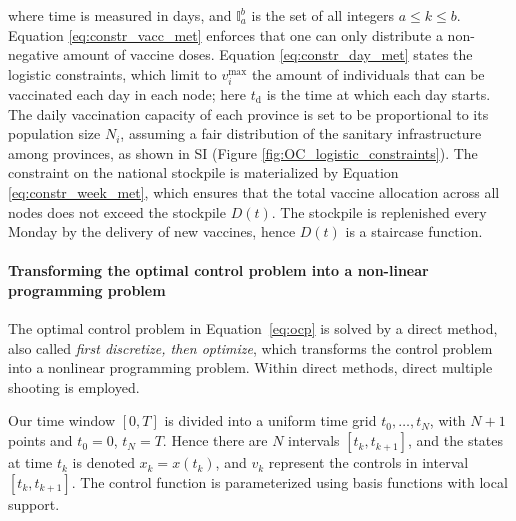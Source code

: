 where time is measured in days, and $\mathbb{I}_a^b$ is the set of all integers $a\leq k\leq b$. Equation \eqref{eq:constr_vacc_met} enforces that one can only distribute a non-negative amount of vaccine doses. Equation \eqref{eq:constr_day_met} states the logistic constraints, which limit to $v_i^\mathrm{max}$ the amount of individuals that can be vaccinated each day in each node; here $t_\mathrm{d}$ is the time at which each day starts. The daily vaccination capacity of each province is set to be proportional to its population size $N_i$, assuming a fair distribution of the sanitary infrastructure among provinces, as shown in SI (Figure \ref{fig:OC_logistic_constraints}). The constraint on the national stockpile is materialized by Equation
\eqref{eq:constr_week_met}, which ensures that the total vaccine allocation across all nodes does not exceed the stockpile $D(t)$. The stockpile is replenished every Monday by the delivery of new vaccines, hence $D(t)$ is a staircase function.



\paragraph{Transforming the optimal control problem into a non-linear programming problem}


The optimal control problem in Equation~\eqref{eq:ocp} is solved by a direct method, also called \emph{first discretize, then optimize}, which transforms the control problem into a nonlinear programming problem. Within direct methods, direct multiple shooting is employed. 


Our time window $[0,T]$ is divided into a uniform time grid $t_0,\ldots,t_N$, with $N+1$ points and $t_0=0$, $t_N=T$. Hence there are $N$ intervals $[t_k,t_{k+1}]$, and the states at time $t_k$ is denoted $x_k=x(t_k)$, and $v_k$  represent the controls in interval $[t_k,t_{k+1}]$. The control function is parameterized using basis functions with local support. 

